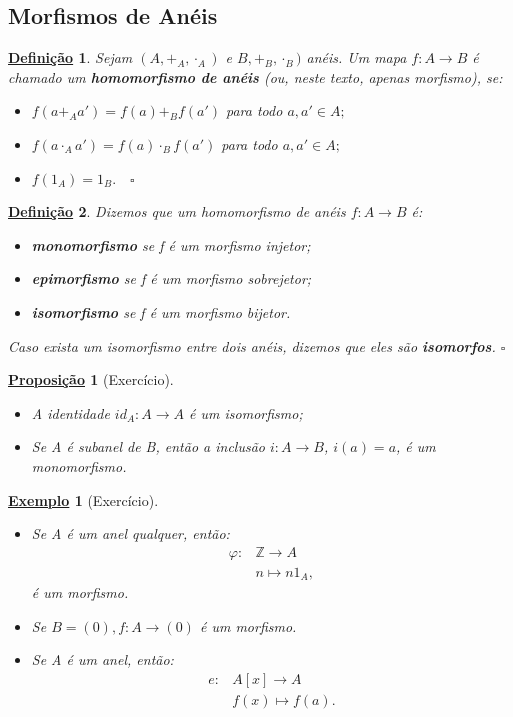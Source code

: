 \documentclass{article}
\newtheorem*{def*}{\underline{Defini\c c\~ao}}
\newtheorem*{prop*}{\underline{Proposi\c c\~ao}}
\newtheorem{example}{\underline{Exemplo}}
\begin{document}
\subsection{Morfismos de Anéis}
\begin{def*}
  Sejam \((A, +_{A}, \cdot_{A})\) e \(B, +_{B}, \cdot_{B})\) anéis. Um mapa \(f:A\rightarrow B\) é chamado um \textbf{homomorfismo de anéis}
(ou, neste texto, apenas morfismo), se:
\begin{itemize}
  \item[i)] \(f(a +_{A} a') = f(a) +_{B} f(a')\) para todo \(a, a'\in A;\)
  \item[ii)] \(f(a \cdot_{A} a') = f(a)\cdot_{B}f(a')\) para todo \(a, a'\in A;\)
  \item[iii)] \(f(1_{A}) = 1_{B}.\quad\square\)
\end{itemize}
\end{def*}
\begin{def*}
  Dizemos que um homomorfismo de anéis \(f:A\rightarrow B\) é:
\begin{itemize}
  \item[1)] \textbf{monomorfismo} se f é um morfismo injetor;
  \item[2)] \textbf{epimorfismo} se f é um morfismo sobrejetor;
  \item[3)] \textbf{isomorfismo} se f é um morfismo bijetor.
\end{itemize}
  Caso exista um isomorfismo entre dois anéis, dizemos que eles são \textbf{isomorfos}. \(\square\)
\end{def*}
\begin{prop*}[Exercício]
\begin{itemize}
  \item[1)] A identidade \(id_{A}:A\rightarrow A\) é um isomorfismo;
  \item[2)] Se A é subanel de B, então a inclusão \(i:A\rightarrow B\), \(i(a) = a\), é
um monomorfismo.
\end{itemize}
\end{prop*}
\begin{example}[Exercício]
\begin{itemize}
  \item[1)] Se A é um anel qualquer, então:
  \begin{align*}
      \varphi:&\mathbb{Z}\rightarrow A\\
              &n\mapsto n1_{A},
  \end{align*}
  é um morfismo.
  \item[2)] Se \(B=(0), f:A\rightarrow (0)\) é um morfismo.
  \item[3)] Se A é um anel, então:
  \begin{align*}
    e:&A[x]\rightarrow A\\
      &f(x)\mapsto f(a).
  \end{align*}
\end{itemize}
\end{example}
\end{document}
